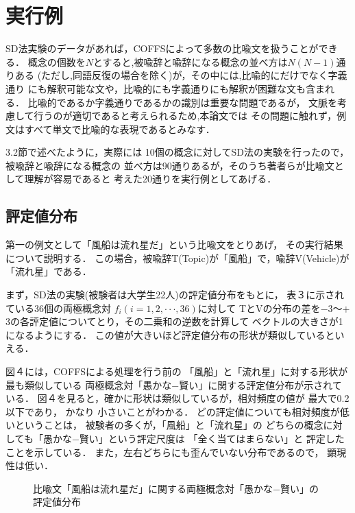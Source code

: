 \section{実行例}

SD法実験のデータがあれば，COFFSによって多数の比喩文を扱うことができる．
概念の個数を$N$とすると,被喩辞と喩辞になる概念の並べ方は$N(N-1)$通りある
(ただし,同語反復の場合を除く)が，その中には,比喩的にだけでなく字義通り
にも解釈可能な文や，比喩的にも字義通りにも解釈が困難な文も含まれる．
比喩的であるか字義通りであるかの識別は重要な問題であるが，
文脈を考慮して行うのが適切であると考えられるため,本論文では
その問題に触れず，例文はすべて単文で比喩的な表現であるとみなす．

3.2節で述べたように，実際には
10個の概念に対してSD法の実験を行ったので，被喩辞と喩辞になる概念の
並べ方は90通りあるが，そのうち著者らが比喩文として理解が容易であると
考えた20通りを実行例としてあげる．


\subsection{評定値分布}

第一の例文として「風船は流れ星だ」という比喩文をとりあげ，
その実行結果について説明する．
この場合，被喩辞T(Topic)が「風船」で，喩辞V(Vehicle)が「流れ星」である．

まず，SD法の実験(被験者は大学生22人)の評定値分布をもとに，
表３に示されている36個の両極概念対
$f_i(i=1,2,\cdot\cdot\cdot,36)$に対して
TとVの分布の差を$-$3〜$+$3の各評定値についてとり，その二乗和の逆数を計算して
ベクトルの大きさが1になるようにする．
この値が大きいほど評定値分布の形状が類似しているといえる．


図４には，COFFSによる処理を行う前の
「風船」と「流れ星」に対する形状が最も類似している
両極概念対「愚かな−賢い」に関する評定値分布が示されている．
図４を見ると，確かに形状は類似しているが，相対頻度の値が
最大で0.2以下であり，
かなり
小さいことがわかる．
どの評定値についても相対頻度が低いということは，
被験者の多くが，「風船」と「流れ星」の
どちらの概念に対しても「愚かな−賢い」という評定尺度は
「全く当てはまらない」と
評定したことを示している．
また，左右どちらにも歪んでいない分布であるので，
顕現性は低い．

\begin{figure}[t]
\begin{center}
\end{center}

\caption{比喩文「風船は流れ星だ」に関する両極概念対「愚かな−賢い」の評定値分布}
\end{figure}


